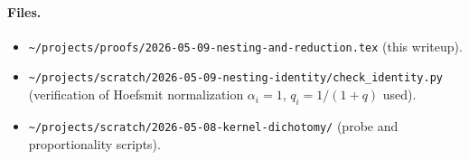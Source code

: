 \documentclass[11pt]{article}
\theoremstyle{definition}
\begin{document}
\paragraph{Files.}
\begin{itemize}[topsep=0.3em,itemsep=0.2em,leftmargin=2em]
\item \texttt{\textasciitilde/projects/proofs/2026-05-09-nesting-and-reduction.tex} (this writeup).
\item \texttt{\textasciitilde/projects/scratch/2026-05-09-nesting-identity/check\_identity.py}
  (verification of Hoefsmit normalization $\alpha_i = 1$, $q_i = 1/(1+q)$ used).
\item \texttt{\textasciitilde/projects/scratch/2026-05-08-kernel-dichotomy/} (probe and proportionality scripts).
\end{itemize}
\end{document}
